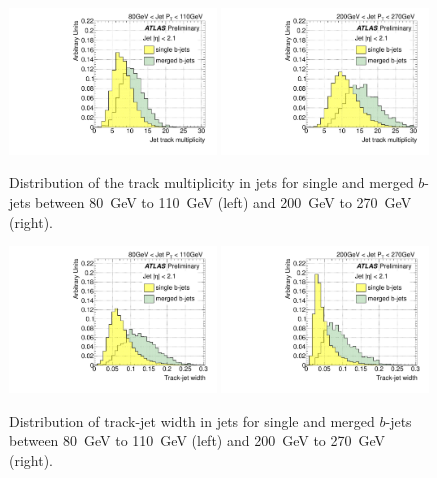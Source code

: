 \begin{figure}[tp]
\centering
\includegraphics[width=0.49\textwidth]{FIGS/VarsSingleMerged/Ntrk080.pdf}
\includegraphics[width=0.49\textwidth]{FIGS/VarsSingleMerged/Ntrk200.pdf}
\caption{Distribution of the track multiplicity in jets for single and merged $b$-jets between 80~GeV to 110~GeV (left) and 200~GeV to 270~GeV (right).}
\label{fig:ntrksinglemerged}
\end{figure}

\begin{figure}[tp]
\centering
\includegraphics[width=0.49\textwidth]{FIGS/VarsSingleMerged/trkWidth080.pdf}
\includegraphics[width=0.49\textwidth]{FIGS/VarsSingleMerged/trkWidth200.pdf}
\caption{Distribution of track-jet width in jets for single and merged $b$-jets between 80~GeV to 110~GeV (left) and 200~GeV to 270~GeV (right).}
\label{fig:trkwidthsinglemerged}
\end{figure}



